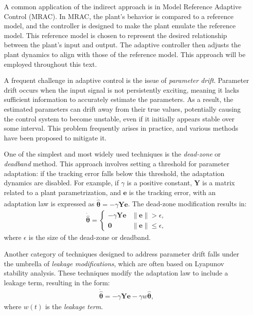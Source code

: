 A common application of the indirect approach is in Model Reference Adaptive Control (MRAC). In MRAC, the plant's behavior is compared to a reference model, and the controller is designed to make the plant emulate the reference model. This reference model is chosen to represent the desired relationship between the plant's input and output. The adaptive controller then adjusts the plant dynamics to align with those of the reference model. This approach will be employed throughout this text.

A frequent challenge in adaptive control is the issue of \emph{parameter drift}. Parameter drift occurs when the input signal is not persistently exciting, meaning it lacks sufficient information to accurately estimate the parameters. As a result, the estimated parameters can drift away from their true values, potentially causing the control system to become unstable, even if it initially appears stable over some interval. This problem frequently arises in practice, and various methods have been proposed to mitigate it.


One of the simplest and most widely used techniques is the \emph{dead-zone} or \emph{deadband} method. This approach involves setting a threshold for parameter adaptation: if the tracking error falls below this threshold, the adaptation dynamics are disabled. For example, if $\gamma$ is a positive constant, $\mathbf{Y}$ is a matrix related to a plant parametrization, and $\mathbf{e}$ is the tracking error, with an adaptation law is expressed as $\dot{\widehat{\boldsymbol{\theta}}} = -\gamma\mathbf{Y}\mathbf{e}$. The dead-zone modification results in:
\begin{align*}
    \dot{\widehat{\boldsymbol{\theta}}} = \begin{cases}
        -\gamma\mathbf{Y}\mathbf{e} &\|\mathbf{e}\| > \epsilon,\\
        \mathbf{0} & \|\mathbf{e}\| \le \epsilon,
    \end{cases}
\end{align*}
where $\epsilon$ is the size of the dead-zone or deadband.

Another category of techniques designed to address parameter drift falls under the umbrella of \emph{leakage modifications}, which are often based on Lyapunov stability analysis. These techniques modify the adaptation law to include a leakage term, resulting in the form:
\begin{align}
    \dot{\widehat{\boldsymbol{\theta}}} = -\gamma\mathbf{Y}\mathbf{e} - \gamma w\widehat{\boldsymbol{\theta}},
\end{align}
where $w(t)$ is the \emph{leakage term}.

